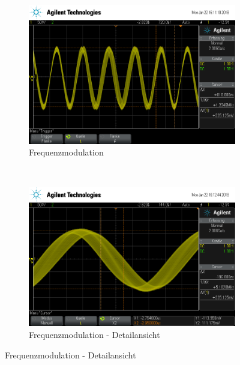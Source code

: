 \begin{figure}[t!]
	\centering
	\begin{subfigure}[t]{0.5\textwidth}
		\centering
		\includegraphics[width=\textwidth]{img/d_scope_233.png}
		\caption{Frequenzmodulation}
	\end{subfigure}%
	~
	\begin{subfigure}[t]{0.5\textwidth}
		\centering
		\includegraphics[width=\textwidth]{img/d_scope_234.png}
		\caption{Frequenzmodulation - Detailansicht}
	\end{subfigure}
\end{figure}

